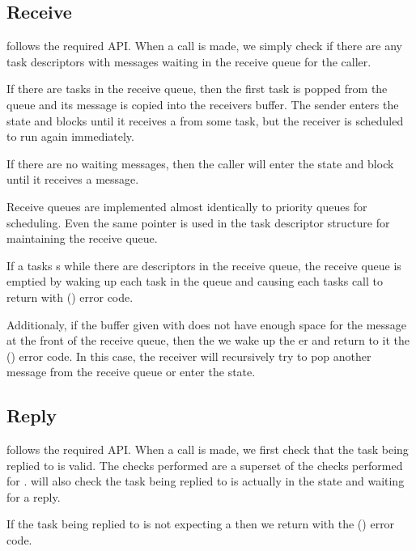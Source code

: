 \documentclass[pdftex,10pt,a4paper]{article}
\begin{document}
\subsection*{Receive}

 follows the required API. When a  call is
made, we simply check if there are any task descriptors with messages
waiting in the receive queue for the caller.

If there are tasks in the receive queue, then the first task is popped
from the queue and its message is copied into the receivers
buffer. The sender enters the  state and blocks
until it receives a  from some task, but the receiver is
scheduled to run again immediately.

If there are no waiting messages, then the caller will enter the
 state and block until it receives a message.

Receive queues are implemented almost identically to priority queues
for scheduling. Even the same  pointer is used in the task
descriptor structure for maintaining the receive queue.

If a tasks s while there are descriptors in the receive
queue, the receive queue is emptied by waking up each task in the
queue and causing each tasks  call to return with
 () error code.

Additionaly, if the buffer given with  does not have
enough space for the message at the front of the receive queue, then
the we wake up the er and return to it the
 () error code. In this case, the
receiver will recursively try to pop another message from the receive
queue or enter the  state.


\subsection*{Reply}

 follows the required API. When a  call is
made, we first check that the task being replied to is valid. The
checks performed are a superset of the checks performed for
.  will also check the task being replied to is
actually in the  state and waiting for a reply.

If the task being replied to is not expecting a  then we
return with the  () error code.
\end{document}
